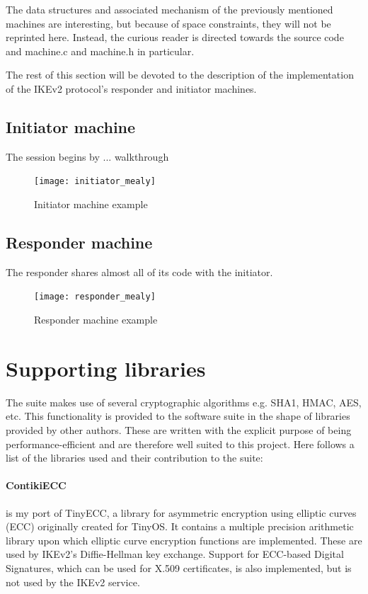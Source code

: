 \documentclass[final,a4paper,twoside,11pt,onecolumn]{report}
\begin{document}
The data structures and associated mechanism of the previously mentioned machines are interesting, but because of space constraints, they will not be reprinted here. Instead, the curious reader is directed towards the source code and machine.c and machine.h in particular.

The rest of this section will be devoted to the description of the implementation of the IKEv2 protocol's responder and initiator machines.

\subsection{Initiator machine}
The session begins by ... walkthrough


\begin{figure}[h!]
   \texttt{[image: initiator\_mealy]}
   \caption{Initiator machine example}
   \label{fig:mealydemo}
\end{figure}

\subsection{Responder machine}
The responder shares almost all of its code with the initiator. 


\begin{figure}[h!]
   \texttt{[image: responder\_mealy]}
   \caption{Responder machine example}
   \label{fig:mealydemo}
\end{figure}


\section{Supporting libraries}
The suite makes use of several cryptographic algorithms e.g. SHA1, HMAC, AES, etc. This functionality is provided to the software suite in the shape of libraries provided by other authors. These are written with the explicit purpose of being performance-efficient and are therefore well suited to this project. Here follows a list of the libraries used and their contribution to the suite:

\paragraph{ContikiECC} is my port of TinyECC, a library for asymmetric encryption using elliptic curves (ECC) originally created for TinyOS. It contains a multiple precision arithmetic library upon which elliptic curve encryption functions are implemented. These are used by IKEv2's Diffie-Hellman key exchange. Support for ECC-based Digital Signatures, which can be used for X.509 certificates, is also implemented, but is not used by the IKEv2 service.
\end{document}
